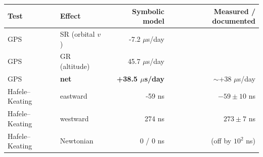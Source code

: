 \begin{tabular}{llrr}
\toprule
Test & Effect & Symbolic model & Measured / documented \\
\midrule
GPS & SR (orbital $v$) & -7.2 $\mu$s/day & \\
GPS & GR (altitude) & 45.7 $\mu$s/day & \\
GPS & \textbf{net} & \textbf{+38.5 $\mu$s/day} & $\sim$+38 $\mu$s/day \\
\midrule
Hafele--Keating & eastward & -59 ns & $-59\pm10$ ns \\
Hafele--Keating & westward & 274 ns & $273\pm7$ ns \\
Hafele--Keating & Newtonian & 0 / 0 ns & (off by $10^2$ ns) \\
\bottomrule
\end{tabular}
